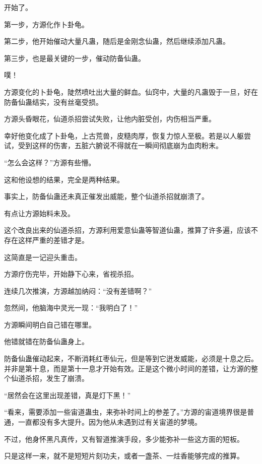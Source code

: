 
\begin{this_body}



开始了。

第一步，方源化作卜卦龟。

第二步，他开始催动大量凡蛊，随后是金刚念仙蛊，然后继续添加凡蛊。

第三步，也是最关键的一步，催动防备仙蛊。

噗！

方源变化的卜卦龟，陡然喷吐出大量的鲜血。仙窍中，大量的凡蛊毁于一旦，好在防备仙蛊结实，没有丝毫受损。

方源头昏眼花，仙道杀招尝试失败，让他内脏受创，内伤相当严重。

幸好他变化成了卜卦龟，上古荒兽，皮糙肉厚，恢复力惊人至极。若是以人躯尝试，受到这样的伤害，五脏六腑说不得就在一瞬间彻底崩为血肉粉末。

“怎么会这样？”方源有些懵。

这和他设想的结果，完全是两种结果。

事实上，防备仙蛊还未真正催发出威能，整个仙道杀招就崩溃了。

有点让方源始料未及。

这个改良出来的仙道杀招，方源利用爱意仙蛊等智道仙蛊，推算了许多遍，应该不存在这样严重的差错才是。

这简直是一记迎头重击。

方源疗伤完毕，开始静下心来，省视杀招。

连续几次推演，方源越加纳闷：“没有差错啊？”

忽然间，他脑海中灵光一现：“我明白了！”

方源瞬间明白自己错在哪里。

他错就错在防备仙蛊身上。

防备仙蛊催动起来，不断消耗红枣仙元，但是等到它迸发威能，必须是十息之后。并非是第十息，而是第十一息才开始有效。正是这个微小时间的差错，让方源的整个仙道杀招，发生了崩溃。

“居然会在这里出现差错，真是灯下黑！”

“看来，需要添加一些宙道蛊虫，来弥补时间上的参差了。”方源的宙道境界很是普通，一直都没有多大提升。因为他从未遇到过有关宙道的梦境。

不过，他身怀黑凡真传，又有智道推演手段，多少能弥补一些这方面的短板。

只是这样一来，就不是短短片刻功夫，或者一盏茶、一炷香能够完成的推算。


\end{this_body}
